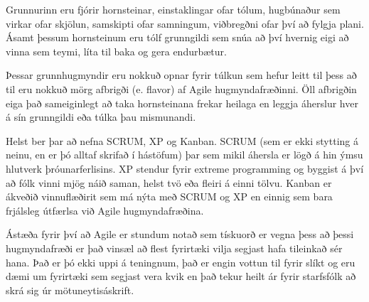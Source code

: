 Grunnurinn eru fjórir hornsteinar, einstaklingar ofar tólum, hugbúnaður sem virkar ofar skjölun, samskipti ofar samningum, viðbregðni ofar því að fylgja plani.
Ásamt þessum hornsteinum eru tólf grunngildi sem snúa að því hvernig eigi að vinna sem teymi, líta til baka og gera endurbætur.

Þessar grunnhugmyndir eru nokkuð opnar fyrir túlkun sem hefur leitt til þess að til eru nokkuð mörg afbrigði (e. flavor) af Agile hugmyndafræðinni.
Öll afbrigðin eiga það sameiginlegt að taka hornsteinana frekar heilaga en leggja áherslur hver á sín grunngildi eða túlka þau mismunandi.

Helst ber þar að nefna SCRUM, XP og Kanban.
SCRUM (sem er ekki stytting á neinu, en er þó alltaf skrifað í hástöfum) þar sem mikil áhersla er lögð á hin ýmsu hlutverk þróunarferlisins.
XP stendur fyrir extreme programming og byggist á því að fólk vinni mjög náið saman, helst tvö eða fleiri á einni tölvu.
Kanban er ákveðið vinnuflæðirit sem má nýta með SCRUM og XP en einnig sem bara frjálsleg útfærlsa við Agile hugmyndafræðina.

Ástæða fyrir því að Agile er stundum notað sem tískuorð er vegna þess að þessi hugmyndafræði er það vinsæl að flest fyrirtæki vilja segjast hafa tileinkað sér hana.
Það er þó ekki uppi á teningnum, það er engin vottun til fyrir slíkt og eru dæmi um fyrirtæki sem segjast vera kvik en það tekur heilt ár fyrir starfsfólk að skrá sig úr mötuneytisáskrift.

